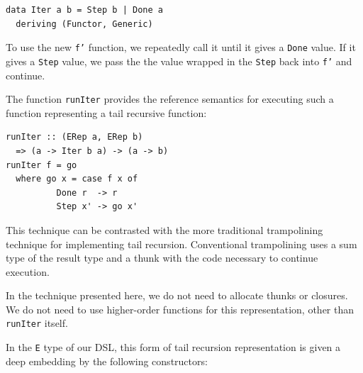 \documentclass[runningheads, a4paper]{llncs}
\newcommand{\ttt}{\texttt}
\newenvironment{todo}
  {\ifthenelse{\isundefined{\showtodos}}{\comment}{\begin{tcolorbox}
    \textbf{TODO}:}}
  {\ifthenelse{\isundefined{\showtodos}}{\endcomment}{\end{tcolorbox}}
  }
\begin{document}
\begin{lstlisting}
data Iter a b = Step b | Done a
  deriving (Functor, Generic)
\end{lstlisting}

To use the new \ttt{f'} function, we repeatedly call it until it gives a
\ttt{Done} value. If it gives a \ttt{Step} value, we pass the the value wrapped
in the \ttt{Step} back into \ttt{f'} and continue.

The function \ttt{runIter} provides the reference semantics for executing such a
function representing a tail recursive function:

\begin{lstlisting}
runIter :: (ERep a, ERep b)
  => (a -> Iter b a) -> (a -> b)
runIter f = go
  where go x = case f x of
          Done r  -> r
          Step x' -> go x'
\end{lstlisting}








This technique can be contrasted with the more traditional trampolining
technique for implementing tail recursion. Conventional trampolining uses a
sum type of the result type and a thunk with the code necessary to continue
execution.~\cite{Ganz:99:Trampolined}

In the technique presented here, we do not need to allocate thunks or closures.
We do not need to use higher-order functions for this representation, other than \ttt{runIter} itself.

In the \ttt{E} type of our DSL, this form of tail recursion representation is
given a deep embedding by the following constructors:
\end{document}
